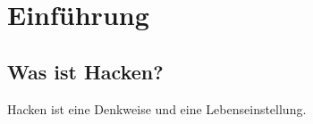 
\chapter{Einführung}

\section{Was ist Hacken?}

Hacken ist eine Denkweise und eine Lebenseinstellung. 